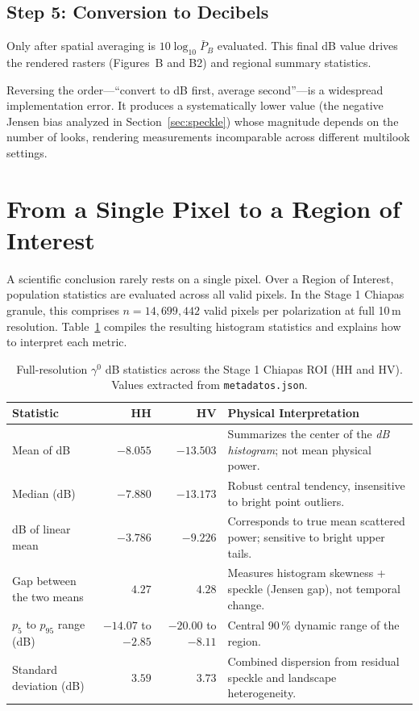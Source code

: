 \documentclass[11pt,a4paper]{article}
\begin{document}
\subsection{Step 5: Conversion to Decibels}

Only after spatial averaging is $10\log_{10}\bar P_B$ evaluated. This final dB value drives the rendered rasters (Figures~B and B2) and regional summary statistics.

\begin{cuidado}
Reversing the order---``convert to dB first, average second''---is a widespread implementation error. It produces a systematically lower value (the negative Jensen bias analyzed in Section~\ref{sec:speckle}) whose magnitude depends on the number of looks, rendering measurements incomparable across different multilook settings.
\end{cuidado}

\section{From a Single Pixel to a Region of Interest}
\label{sec:region}

A scientific conclusion rarely rests on a single pixel. Over a Region of Interest, population statistics are evaluated across all valid pixels. In the Stage 1 Chiapas granule, this comprises $n=14,699,442$ valid pixels per polarization at full 10\,m resolution. Table~\ref{tab:stats-roi} compiles the resulting histogram statistics and explains how to interpret each metric.

\begin{table}[htbp]
\centering\small
\begin{tabularx}{\linewidth}{p{.3\linewidth}rrX}
\toprule
\textbf{Statistic} & \textbf{HH} & \textbf{HV} & \textbf{Physical Interpretation}\\\midrule
Mean of dB & $-8.055$ & $-13.503$ & Summarizes the center of the \emph{dB histogram}; not mean physical power.\\
Median (dB) & $-7.880$ & $-13.173$ & Robust central tendency, insensitive to bright point outliers.\\
dB of linear mean & $-3.786$ & $-9.226$ & Corresponds to true mean scattered power; sensitive to bright upper tails.\\
Gap between the two means & $4.27$ & $4.28$ & Measures histogram skewness + speckle (Jensen gap), not temporal change.\\
$p_5$ to $p_{95}$ range (dB) & $-14.07$ to $-2.85$ & $-20.00$ to $-8.11$ & Central 90\,\% dynamic range of the region.\\
Standard deviation (dB) & $3.59$ & $3.73$ & Combined dispersion from residual speckle and landscape heterogeneity.\\\bottomrule
\end{tabularx}
\caption{Full-resolution $\gamma^0$ dB statistics across the Stage 1 Chiapas ROI (HH and HV). Values extracted from \texttt{metadatos.json}.}
\label{tab:stats-roi}
\end{table}
\end{document}

